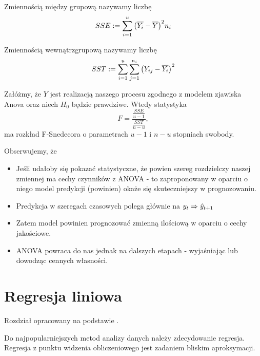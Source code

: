 \documentclass[10pt,a4paper]{book}
\begin{document}
\begin{definition}
Zmiennością między grupową nazywamy liczbę
$$
SSE := \sum_{i=1}^{u} \bracket{\mean{Y_i} - \mean{Y}}^2 n_i 
$$
\end{definition}

\begin{definition}
Zmiennością wewnątrzgrupową nazywamy liczbę
$$
SST := \sum_{i=1}^{u}  \sum_{j=1}^{n_i} \bracket{Y_{ij} - \mean{Y_i}}^2  
$$
\end{definition}

\begin{theorem}
Załóżmy, że $Y$ jest realizacją naszego procesu zgodnego z modelem zjawiska Anova oraz niech $H_0$ będzie prawdziwe. Wtedy statystyka
$$
F = \frac{\frac{SSE}{u-1}}{\frac{SST}{n-u}},
$$
ma rozkład F-Snedecora o parametrach $u-1$ i $n-u$ stopniach swobody.
\end{theorem}

Obserwujemy, że
\begin{itemize}
\item Jeśli udałoby się pokazać statystyczne, że powien szereg rozdzielczy naszej zmiennej ma cechy czynników z ANOVA - to zaproponowany w oparciu o niego model predykcji (powinien) okaże się skuteczniejszy w prognozowaniu.
\item Predykcja w szeregach czasowych polega głównie na $y_t \Rightarrow \predict{y}{t+1}$
\item Zatem model powinien prognozować zmienną ilościową w oparciu o cechy jakościowe.
\item ANOVA powraca do nas jednak na dalszych etapach - wyjaśniając lub dowodząc cennych własności.
\end{itemize}

\section{Regresja liniowa}

Rozdział opracowany na podstawie \cite{montgomery2015introduction}.

Do najpopularniejszych metod analizy danych należy zdecydowanie regresja. Regresja z punktu widzenia obliczeniowego jest zadaniem bliskim aproksymacji.
\end{document}
